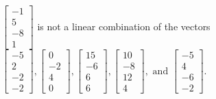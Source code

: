 \begin{exercise}
\begin{exerciseStatement}
  \end{exerciseStatement}
  \begin{exerciseAnswer}
   \(\left[\begin{array}{c}
-1 \\
5 \\
-8 \\
1
\end{array}\right]\) 
  	 is not  
	a linear combination of the vectors \(\left[\begin{array}{c}
-5 \\
2 \\
-2 \\
-2
\end{array}\right] , \left[\begin{array}{c}
0 \\
-2 \\
4 \\
0
\end{array}\right] , \left[\begin{array}{c}
15 \\
-6 \\
6 \\
6
\end{array}\right] , \left[\begin{array}{c}
10 \\
-8 \\
12 \\
4
\end{array}\right] , \text{ and } \left[\begin{array}{c}
-5 \\
4 \\
-6 \\
-2
\end{array}\right]\).

	
  


  \end{exerciseAnswer}
\end{exercise}
